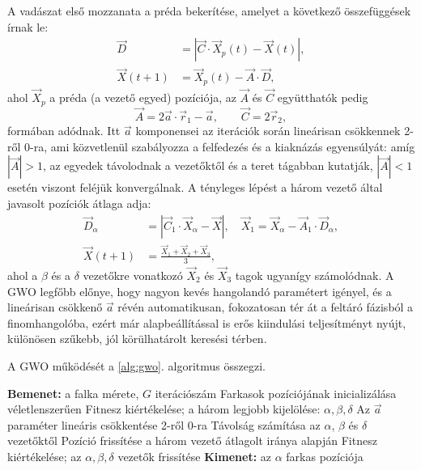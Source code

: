 A vadászat első mozzanata a préda bekerítése, amelyet a következő összefüggések írnak le:
\begin{align}
\vec{D} &= |\vec{C} \cdot \vec{X}_p(t) - \vec{X}(t)|, \\
\vec{X}(t+1) &= \vec{X}_p(t) - \vec{A} \cdot \vec{D},
\end{align}
ahol $\vec{X}_p$ a préda (a vezető egyed) pozíciója, az $\vec{A}$ és $\vec{C}$ együtthatók pedig
\begin{equation}
\vec{A} = 2\vec{a} \cdot \vec{r}_1 - \vec{a}, \qquad \vec{C} = 2\vec{r}_2,
\end{equation}
formában adódnak. Itt $\vec{a}$ komponensei az iterációk során lineárisan csökkennek 2-ről 0-ra, ami közvetlenül szabályozza a felfedezés és a kiaknázás egyensúlyát: amíg $|\vec{A}| > 1$, az egyedek távolodnak a vezetőktől és a teret tágabban kutatják, $|\vec{A}| < 1$ esetén viszont feléjük konvergálnak. A tényleges lépést a három vezető által javasolt pozíciók átlaga adja:
\begin{align}
\vec{D}_\alpha &= |\vec{C}_1 \cdot \vec{X}_\alpha - \vec{X}|, \quad
\vec{X}_1 = \vec{X}_\alpha - \vec{A}_1 \cdot \vec{D}_\alpha, \\
\vec{X}(t+1) &= \frac{\vec{X}_1 + \vec{X}_2 + \vec{X}_3}{3},
\end{align}
ahol a $\beta$ és a $\delta$ vezetőkre vonatkozó $\vec{X}_2$ és $\vec{X}_3$ tagok ugyanígy számolódnak. A GWO legfőbb előnye, hogy nagyon kevés hangolandó paramétert igényel, és a lineárisan csökkenő $\vec{a}$ révén automatikusan, fokozatosan tér át a feltáró fázisból a finomhangolóba, ezért már alapbeállítással is erős kiindulási teljesítményt nyújt, különösen szűkebb, jól körülhatárolt keresési térben.

A GWO működését a \ref{alg:gwo}. algoritmus összegzi.
\begin{algorithm}[H]
\caption{Szürkefarkas-optimalizáló (GWO)}
\label{alg:gwo}
\begin{algorithmic}[1]
\State \textbf{Bemenet:} a falka mérete, $G$ iterációszám
\State Farkasok pozíciójának inicializálása véletlenszerűen
\State Fitnesz kiértékelése; a három legjobb kijelölése: $\alpha, \beta, \delta$
    \State Az $\vec{a}$ paraméter lineáris csökkentése 2-ről 0-ra
        \State Távolság számítása az $\alpha$, $\beta$ és $\delta$ vezetőktől
        \State Pozíció frissítése a három vezető átlagolt iránya alapján
    \EndFor
    \State Fitnesz kiértékelése; az $\alpha, \beta, \delta$ vezetők frissítése
\EndFor
\State \textbf{Kimenet:} az $\alpha$ farkas pozíciója
\end{algorithmic}
\end{algorithm}


